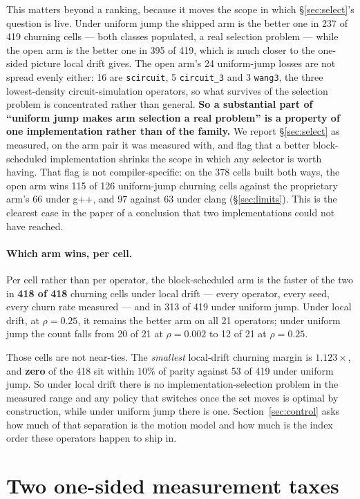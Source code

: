 \documentclass{article}
\begin{document}
This matters beyond a ranking, because it moves the scope in which
\S\ref{sec:select}'s question is live. Under uniform jump the shipped arm is the
better one in 237 of 419 churning cells --- both classes populated, a real
selection problem --- while the open arm is the better one in 395 of 419, which
is much closer to the one-sided picture local drift gives. The open arm's 24
uniform-jump losses are not spread evenly either: 16 are \texttt{scircuit}, 5
\texttt{circuit\_3} and 3 \texttt{wang3}, the three lowest-density
circuit-simulation operators, so what survives of the selection problem is
concentrated rather than general. \textbf{So a substantial part
of ``uniform jump makes arm selection a real problem'' is a property of one
implementation rather than of the family.} We report \S\ref{sec:select} as
measured, on the arm pair it was measured with, and flag that a better
block-scheduled implementation shrinks the scope in which any selector is worth
having. That flag is not compiler-specific: on the 378 cells built both ways,
the open arm wins 115 of 126 uniform-jump churning cells against the proprietary
arm's 66 under g++, and 97 against 63 under clang (\S\ref{sec:limits}). This is
the clearest case in the paper of a conclusion that two implementations could
not have reached.

\paragraph{Which arm wins, per cell.}
Per cell rather than per operator, the block-scheduled arm is the faster of the
two in \textbf{418 of 418} churning cells under local drift --- every operator,
every seed, every churn rate measured --- and in 313 of 419 under uniform jump.
Under local drift, at $\rho{=}0.25$, it remains the better arm on all 21
operators; under uniform jump the count falls from 20 of 21 at $\rho{=}0.002$ to
12 of 21 at $\rho{=}0.25$.

Those cells are not near-ties. The \emph{smallest} local-drift churning margin
is $1.123\times$, and \textbf{zero} of the 418 sit within $10\%$ of parity
against 53 of 419 under uniform jump. So under local drift there is no
implementation-selection problem in the measured range and any policy that
switches once the set moves is optimal by construction, while under uniform jump
there is one. Section~\ref{sec:control} asks how much of that separation is the
motion model and how much is the index order these operators happen to ship
in.

\section{Two one-sided measurement taxes}
\label{sec:defect}
\end{document}
